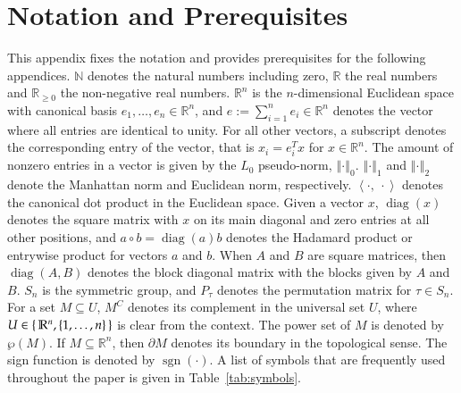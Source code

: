 \documentclass[twoside,11pt]{article}
\DeclareMathOperator{\sgn}{sgn}
\DeclareMathOperator{\hada}{\circ}
\DeclareMathOperator{\diag}{diag}
\newcommand{\N}{\mathbb{N}}
\newcommand{\R}{\mathbb{R}}
\newcommand{\0}{\mathcal{O}}
\newcommand{\transp}{^T}
\newcommand{\comp}{^C}
\newcommand{\norm}[1]{\left\Vert#1\right\Vert}
\newcommand{\scp}[2]{\left<#1,\ #2\right>}
\newcommand{\discint}[2]{\{#1,\dotsc,#2\}}
\renewcommand{\P}{\wp}
\begin{document}

\appendix
\section{Notation and Prerequisites}
\label{sect:notation}
This appendix fixes the notation and provides prerequisites for the following appendices.
$\N$ denotes the natural numbers including zero, $\R$ the real numbers and $\R_{\geq 0}$ the non-negative real numbers.
$\R^n$ is the $n$-dimensional Euclidean space with canonical basis $e_1,\dotsc,e_n\in\R^n$, and $e := \sum_{i=1}^ne_i\in\R^n$ denotes the vector where all entries are identical to unity.
For all other vectors, a subscript denotes the corresponding entry of the vector, that is $x_i = e_i\transp x$ for $x\in\R^n$.
The amount of nonzero entries in a vector is given by the $L_0$ pseudo-norm, $\norm{\cdot}_0$.
$\norm{\cdot}_1$ and $\norm{\cdot}_2$ denote the Manhattan norm and Euclidean norm, respectively.
$\scp{\cdot}{\cdot}$ denotes the canonical dot product in the Euclidean space.
Given a vector $x$, $\diag(x)$ denotes the square matrix with $x$ on its main diagonal and zero entries at all other positions, and $a\hada b = \diag(a)b$ denotes the Hadamard product or entrywise product for vectors $a$ and $b$.
When $A$ and $B$ are square matrices, then $\diag(A, B)$ denotes the block diagonal matrix with the blocks given by $A$ and $B$.
$S_n$ is the symmetric group, and $P_\tau$ denotes the permutation matrix for $\tau\in S_n$.
For a set $M\subseteq U$, $M\comp$ denotes its complement in the universal set $U$, where $U\in\set{\R^n, \discint{1}{n}}$ is clear from the context.
The power set of $M$ is denoted by $\P(M)$.
If $M\subseteq\R^n$, then $\partial M$ denotes its boundary in the topological sense.
The sign function is denoted by $\sgn(\cdot)$.
A list of symbols that are frequently used throughout the paper is given in Table~\ref{tab:symbols}.
\end{document}
